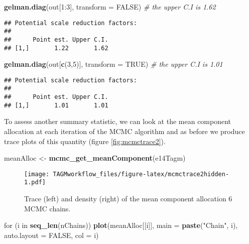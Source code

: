 \documentclass[]{article}
\newenvironment{Shaded}{\begin{snugshade}}{\end{snugshade}}
\newcommand{\KeywordTok}[1]{\textcolor[rgb]{0.13,0.29,0.53}{\textbf{{#1}}}}
\newcommand{\DataTypeTok}[1]{\textcolor[rgb]{0.13,0.29,0.53}{{#1}}}
\newcommand{\DecValTok}[1]{\textcolor[rgb]{0.00,0.00,0.81}{{#1}}}
\newcommand{\StringTok}[1]{\textcolor[rgb]{0.31,0.60,0.02}{{#1}}}
\newcommand{\CommentTok}[1]{\textcolor[rgb]{0.56,0.35,0.01}{\textit{{#1}}}}
\newcommand{\OtherTok}[1]{\textcolor[rgb]{0.56,0.35,0.01}{{#1}}}
\newcommand{\NormalTok}[1]{{#1}}
\begin{document}
\begin{Shaded}
\begin{Highlighting}[]
\KeywordTok{gelman.diag}\NormalTok{(out[}\DecValTok{1}\NormalTok{:}\DecValTok{3}\NormalTok{], }\DataTypeTok{transform =} \OtherTok{FALSE}\NormalTok{) }\CommentTok{# the upper C.I is 1.62}
\end{Highlighting}
\end{Shaded}

\begin{verbatim}
## Potential scale reduction factors:
## 
##      Point est. Upper C.I.
## [1,]       1.22       1.62
\end{verbatim}

\begin{Shaded}
\begin{Highlighting}[]
\KeywordTok{gelman.diag}\NormalTok{(out[}\KeywordTok{c}\NormalTok{(}\DecValTok{3}\NormalTok{,}\DecValTok{5}\NormalTok{)], }\DataTypeTok{transform =} \OtherTok{TRUE}\NormalTok{) }\CommentTok{# the upper C.I is 1.01}
\end{Highlighting}
\end{Shaded}

\begin{verbatim}
## Potential scale reduction factors:
## 
##      Point est. Upper C.I.
## [1,]       1.01       1.01
\end{verbatim}

To assess another summary statistic, we can look at the mean component
allocation at each iteration of the MCMC algorithm and as before we
produce trace plots of this quantity (figure \ref{fig:mcmctrace2}).

\begin{Shaded}
\begin{Highlighting}[]
\NormalTok{meanAlloc <-}\StringTok{ }\KeywordTok{mcmc_get_meanComponent}\NormalTok{(e14Tagm)}
\end{Highlighting}
\end{Shaded}

\begin{figure}[htbp]
\centering
\texttt{[image: TAGMworkflow\_files/figure-latex/mcmctrace2hidden-1.pdf]}
\caption{\label{fig:mcmctrace2hidden}Trace (left) and density (right) of the
mean component allocation 6 MCMC chains.}
\end{figure}

\begin{Shaded}
\begin{Highlighting}[]
\NormalTok{for (i in }\KeywordTok{seq_len}\NormalTok{(nChains))}
    \KeywordTok{plot}\NormalTok{(meanAlloc[[i]], }\DataTypeTok{main =} \KeywordTok{paste}\NormalTok{(}\StringTok{"Chain"}\NormalTok{, i), }\DataTypeTok{auto.layout =} \OtherTok{FALSE}\NormalTok{, }\DataTypeTok{col =} \NormalTok{i)}
\end{Highlighting}
\end{Shaded}
\end{document}
